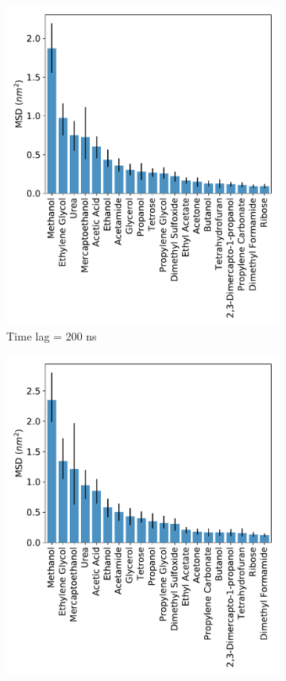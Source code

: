 \documentclass{article}
\begin{document}
  \begin{figure}[!htb]
  \centering
  \begin{subfigure}{0.325\textwidth}
  \includegraphics[width=\textwidth]{all_10wt_tamsds_F0_2.pdf}
  \caption{Time lag = 200 ns}\label{fig:F0.2}
  \end{subfigure}
  \begin{subfigure}{0.325\textwidth}
  \includegraphics[width=\textwidth]{all_10wt_tamsds_F0_3.pdf}

\end{subfigure}
\end{figure}
\end{document}

